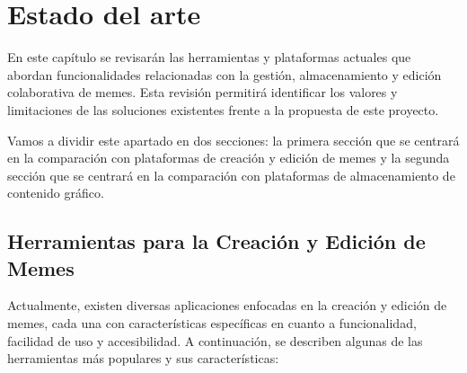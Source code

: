 \chapter{Estado del arte}

En este capítulo se revisarán las herramientas y plataformas actuales que abordan funcionalidades relacionadas con la gestión, almacenamiento y edición colaborativa de memes. Esta revisión permitirá identificar los valores y limitaciones de las soluciones existentes frente a la propuesta de este proyecto.

Vamos a dividir este apartado en dos secciones: la primera sección que se centrará en la comparación con plataformas de creación y edición de memes y la segunda sección que se centrará en la comparación con plataformas de almacenamiento de contenido gráfico.

\section{Herramientas para la Creación y Edición de Memes}

Actualmente, existen diversas aplicaciones enfocadas en la creación y edición de memes, cada una con características específicas en cuanto a funcionalidad, facilidad de uso y accesibilidad. A continuación, se describen algunas de las herramientas más populares y sus características:

